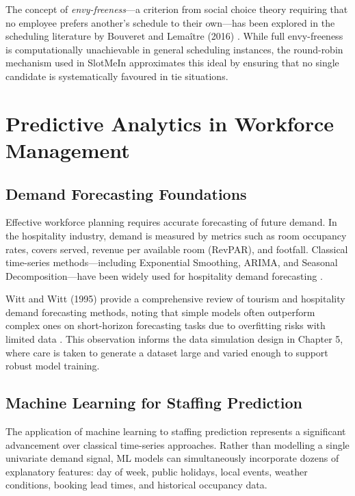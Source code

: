 \documentclass[12pt,a4paper]{report}
\begin{document}
The concept of \textit{envy-freeness}—a criterion from social choice theory requiring that no employee prefers another's schedule to their own—has been explored in the scheduling literature by Bouveret and Lemaître (2016) \cite{bouveret_lemaitre_2016}. While full envy-freeness is computationally unachievable in general scheduling instances, the round-robin mechanism used in SlotMeIn approximates this ideal by ensuring that no single candidate is systematically favoured in tie situations.

\section{Predictive Analytics in Workforce Management}

\subsection{Demand Forecasting Foundations}

Effective workforce planning requires accurate forecasting of future demand. In the hospitality industry, demand is measured by metrics such as room occupancy rates, covers served, revenue per available room (RevPAR), and footfall. Classical time-series methods—including Exponential Smoothing, ARIMA, and Seasonal Decomposition—have been widely used for hospitality demand forecasting \cite{witt_witt_1995}.

Witt and Witt (1995) provide a comprehensive review of tourism and hospitality demand forecasting methods, noting that simple models often outperform complex ones on short-horizon forecasting tasks due to overfitting risks with limited data \cite{witt_witt_1995}. This observation informs the data simulation design in Chapter 5, where care is taken to generate a dataset large and varied enough to support robust model training.

\subsection{Machine Learning for Staffing Prediction}

The application of machine learning to staffing prediction represents a significant advancement over classical time-series approaches. Rather than modelling a single univariate demand signal, ML models can simultaneously incorporate dozens of explanatory features: day of week, public holidays, local events, weather conditions, booking lead times, and historical occupancy data.
\end{document}
